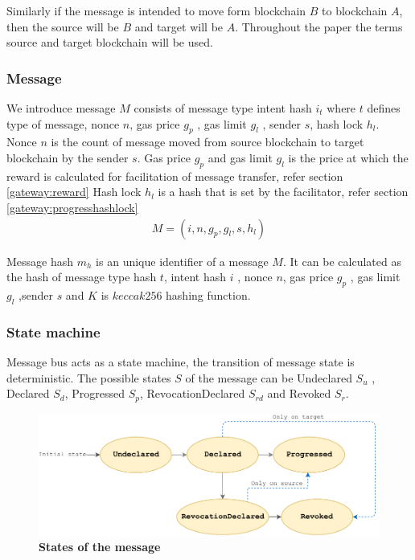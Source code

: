 \documentclass[12pt,a4paper]{article}
\begin{document}
Similarly if the message is intended to move form blockchain $B$ to blockchain $A$, then the source will be $B$ and target will be $A$.
Throughout the paper the terms source and target blockchain will be used.

\subsubsection{Message}\label{gateway:message}
We introduce message $M$ consists of message type intent hash $i_t$ where $t$ defines type of message, nonce $n$, gas price $g_p$ , gas limit $g_l$ , sender $s$, hash lock $h_l$. 
Nonce $n$ is the count of message moved from source blockchain to target blockchain by the sender $s$. 
Gas price $g_p$ and gas limit $g_l$  is the price at which the reward is calculated for facilitation of message transfer, refer section \ref{gateway:reward}  
Hash lock $h_l$ is a hash that is set by the facilitator, refer section \ref{gateway:progresshashlock} 
\begin{align}
  M = (i, n, g_p, g_l, s, h_l) 
\end{align}

Message hash $m_h$ is an unique identifier of a message $M$. It can be calculated as the hash of message type hash $t$, intent hash $i$ , nonce $n$, gas price $g_p$ , gas limit $g_l$ ,sender $s$ and $K$ is $keccak256$ hashing function. 

\subsubsection{State machine}\label{gateway:statemachine} 
Message bus acts as a state machine, the transition of message state is deterministic. 
The possible states $S$ of the message can be Undeclared $S_u$ , Declared $S_d$, Progressed $S_p$, RevocationDeclared $S_{rd}$  and Revoked $S_r$. 
\begin{figure}[htb]
    \centering
	\includegraphics[width=\textwidth]{state_diagram}
	\caption{\textbf{States of the message}}
	\label{fig:state_diagram}
\end{figure}
\end{document}

